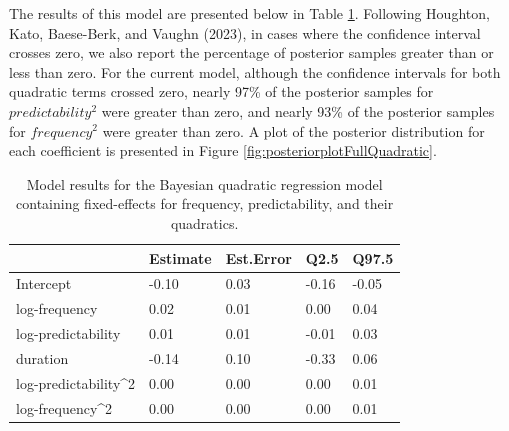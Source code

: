 \documentclass[
  man,floatsintext]{apa6}
\begin{document}
The results of this model are presented below in Table \ref{tab:brmsQuadraticNoInter}. Following Houghton, Kato, Baese-Berk, and Vaughn (2023), in cases where the confidence interval crosses zero, we also report the percentage of posterior samples greater than or less than zero. For the current model, although the confidence intervals for both quadratic terms crossed zero, nearly 97\% of the posterior samples for \(predictability^2\) were greater than zero, and nearly 93\% of the posterior samples for \(frequency^2\) were greater than zero. A plot of the posterior distribution for each coefficient is presented in Figure \ref{fig:posteriorplotFullQuadratic}.

\begin{table}[H]

\begin{center}
\begin{threeparttable}

\caption{\label{tab:brmsQuadraticNoInter}Model results for the Bayesian quadratic regression model containing fixed-effects for frequency, predictability, and their quadratics.}

\begin{tabular}{lllll}
\toprule
 & \multicolumn{1}{c}{Estimate} & \multicolumn{1}{c}{Est.Error} & \multicolumn{1}{c}{Q2.5} & \multicolumn{1}{c}{Q97.5}\\
\midrule
Intercept & -0.10 & 0.03 & -0.16 & -0.05\\
log-frequency & 0.02 & 0.01 & 0.00 & 0.04\\
log-predictability & 0.01 & 0.01 & -0.01 & 0.03\\
duration & -0.14 & 0.10 & -0.33 & 0.06\\
log-predictability\textasciicircum{}2 & 0.00 & 0.00 & 0.00 & 0.01\\
log-frequency\textasciicircum{}2 & 0.00 & 0.00 & 0.00 & 0.01\\
\bottomrule
\end{tabular}

\end{threeparttable}
\end{center}

\end{table}
\end{document}
